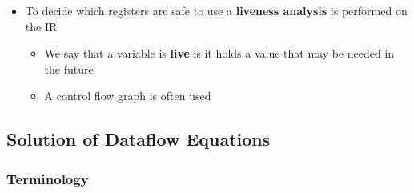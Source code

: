 \documentclass[11pt]{article}
\begin{document}
\begin{itemize}
\item To decide which registers are safe to use a \textbf{liveness analysis} is performed on the IR  
\begin{itemize}
\item We say that a variable is \textbf{live} is it holds a value that may be needed in the future
\item A control flow graph is often used
\end{itemize}
\end{itemize}

\subsection{Solution of Dataflow Equations}
\label{sec:orgcf3c395}
\subsubsection{Terminology}
\label{sec:org3d9b2ce}
\end{document}
